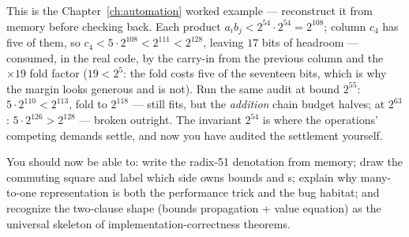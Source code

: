 \pathway This is the Chapter~\ref{ch:automation} worked example ---
reconstruct it from memory before checking back.
\answer Each product $a_i b_j < 2^{54} \cdot 2^{54} = 2^{108}$; column
$c_4$ has five of them, so $c_4 < 5 \cdot 2^{108} < 2^{111} < 2^{128}$,
leaving $17$ bits of headroom --- consumed, in the real code, by the
carry-in from the previous column and the $\times 19$ fold factor
($19 < 2^5$: the fold costs five of the seventeen bits, which is why the
margin looks generous and is not). Run the same audit at bound $2^{55}$:
$5 \cdot 2^{110} < 2^{113}$, fold to $2^{118}$ --- still fits, but the
\emph{addition} chain budget halves; at $2^{63}$: $5 \cdot 2^{126} >
2^{128}$ --- broken outright. The invariant $2^{54}$ is where the
operations' competing demands settle, and now you have audited the
settlement yourself.

\begin{checkpoint}
You should now be able to: write the radix-51 denotation from memory; draw
the commuting square and label which side owns bounds and s;
explain why many-to-one representation is both the performance trick and
the bug habitat; and recognize the two-clause shape (bounds propagation +
value equation) as the universal skeleton of implementation-correctness
theorems.
\end{checkpoint}
